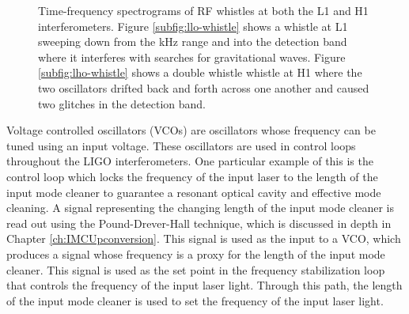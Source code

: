 \begin{figure}[ht!]%
\centering
{}
  
\caption[Spectrograms of RF whistles]{Time-frequency spectrograms of RF whistles at %
         both the L1 and H1 interferometers. Figure \ref{subfig:llo-whistle} shows a %
         whistle at L1 sweeping down from the kHz range and into the detection band %
         where it interferes with searches for gravitational waves. Figure %
         \ref{subfig:lho-whistle} shows a double whistle whistle at H1 where the %
         two oscillators drifted back and forth across one another and caused two %
         glitches in the detection band.}
\label{fig:whistle-spectrograms}
\end{figure}

Voltage controlled oscillators (VCOs) are oscillators whose frequency can 
be tuned using an input voltage. These oscillators are used in control 
loops throughout the LIGO interferometers. One particular example of this 
is the control loop which locks the frequency of the input laser to the 
length of the input mode cleaner to guarantee a resonant optical cavity and 
effective mode cleaning. A signal representing the changing length 
of the input mode cleaner is read out using the Pound-Drever-Hall technique, 
which is discussed in depth in Chapter \ref{ch:IMCUpconversion}. 
This signal is used as the input to a VCO, which produces a 
signal whose frequency is a proxy for the length of the input mode cleaner. 
This signal is used as the set point in the frequency stabilization loop that 
controls the frequency of the input laser light. Through this path, the length 
of the input mode cleaner is used to set the frequency of the input laser light. 

